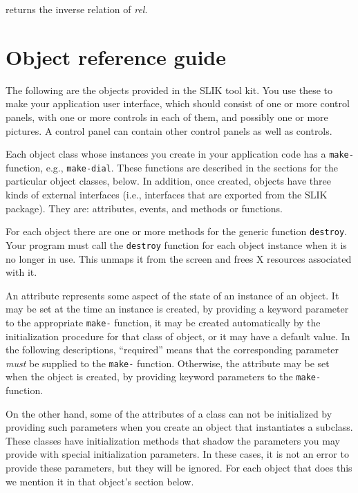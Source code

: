 \documentclass[twoside,openright,11pt]{report}
\newcommand{\tp}[1]{\texttt{#1}}
\begin{document}
{returns the inverse relation of \emph{rel}.}

\chapter{Object reference guide} \label{sec:objects}

The following are the objects provided in the SLIK tool kit.  You use
these to make your application user interface, which should consist of
one or more control panels, with one or more controls in each of them,
and possibly one or more pictures.  A control panel can contain other
control panels as well as controls.

Each object class whose instances you create in your application code
has a \tp{make-} function, e.g., \tp{make-dial}.  These
functions are described in the sections for the particular object
classes, below.  In addition, once created, objects have three kinds
of external interfaces (i.e., interfaces that are exported from the
SLIK package).  They are: attributes, events, and methods or
functions.

For each object there are one or more methods for the generic function
\tp{destroy}.  Your program must call the \tp{destroy}
function for each object instance when it is no longer in use.  This
unmaps it from the screen and frees X resources associated with it.

An attribute represents some aspect of the state of an instance of an
object.  It may be set at the time an instance is created, by
providing a keyword parameter to the appropriate \tp{make-}
function, it may be created automatically by the initialization
procedure for that class of object, or it may have a default value.
In the following descriptions, ``required'' means that the
corresponding parameter \emph{must} be supplied to the \tp{make-}
function.  Otherwise, the attribute may be set when the object is
created, by providing keyword parameters to the \tp{make-}
function.

On the other hand, some of the attributes of a class can not be
initialized by providing such parameters when you create an object
that instantiates a subclass.  These classes have initialization
methods that shadow the parameters you may provide with special
initialization parameters.  In these cases, it is not an error to
provide these parameters, but they will be ignored.  For each object
that does this we mention it in that object's section below.
\end{document}
